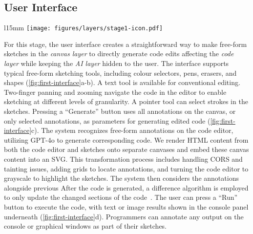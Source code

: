 \subsection{User Interface}
\begin{wrapfigure}{l}{15mm}
\vspace{-3mm} \texttt{[image: figures/layers/stage1-icon.pdf]}
\end{wrapfigure} 
For this stage, the user interface creates a straightforward way to make free-form sketches in the \textit{canvas layer} to directly generate code edits affecting the \textit{code layer} while keeping the \textit{AI layer} hidden to the user.
The interface supports typical free-form sketching tools, including colour selectors, pens, erasers, and shapes (\autoref{fig:first-interface}a-b). A text tool is available for conventional editing. 
Two-finger panning and zooming navigate the code in the editor to enable sketching at different levels of granularity. A pointer tool can select strokes in the sketches. Pressing a ``Generate'' button uses all annotations on the canvas, or only selected annotations, as parameters for generating edited code (\autoref{fig:first-interface}c). 
The system recognizes free-form annotations on the code editor, utilizing GPT-4o to generate corresponding code. 
We render HTML content from both the code editor and sketches onto separate canvases and embed these canvas content into an SVG. This transformation process includes handling CORS and tainting issues, adding grids to locate annotations, and turning the code editor to grayscale to highlight the sketches.
The system then considers the annotations alongside previous
After the code is generated, a difference algorithm is employed to 
only update the changed sections of the code~\cite{myers1986nd}.
The user can press a ``Run'' button to execute the code, with text or image results shown in the console panel underneath (\autoref{fig:first-interface}d). Programmers can annotate any output on the console or graphical windows as part of their sketches. 



